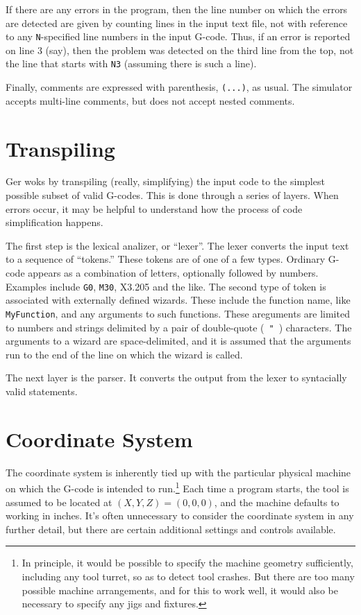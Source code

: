 \documentclass[titlepage,oneside,10pt]{article}
\begin{document}
If there are any errors in the program, then the line number on
which the errors are detected are given by counting lines in the input
text file, not with reference to any {\tt N}-specified line numbers in
the input G-code. Thus, if an error is reported on line 3 (say), then the
problem was detected on the third line from the top, not the line that
starts with {\tt N3} (assuming there is such a line).

Finally, comments are expressed with parenthesis, {\tt (...)}, as
usual. The simulator accepts multi-line comments, but does not accept
nested comments.


\vskip 2cm

\section{Transpiling}

Ger woks by transpiling (really, simplifying) the input code to
the simplest possible subset of valid G-codes. This is done through a
series of layers. When errors occur, it may be helpful to
understand how the process of code simplification happens.

The first step is the lexical analizer, or ``lexer''. The lexer
converts the input text to a sequence of ``tokens.'' These tokens are
of one of a few types. Ordinary G-code appears as a combination of
letters, optionally followed by numbers. Examples include {\tt G0},
{\tt M30}, {X3.205} and the like. The second type of token is
associated with externally defined wizards. These include the
function name, like {\tt MyFunction}, and any arguments to such
functions. These areguments are limited to numbers and strings
delimited by a pair of double-quote (\ {\tt "}\ ) characters. The
arguments to a wizard are space-delimited, and it is assumed that
the arguments run to the end of the line on which the wizard is
called.

The next layer is the parser. It converts the output from the lexer to
syntacially valid statements. 

\section{Coordinate System}

The coordinate system is inherently tied up with the
particular physical machine on which the G-code is intended to
run.\footnote{In principle, it would be possible to specify the machine
geometry sufficiently, including any tool turret, so as to detect
tool crashes. But there are too many possible machine
arrangements, and for this to work well, it would also be necessary to
specify any jigs and fixtures.} Each time a program starts, the tool
is assumed to be located at $(X,Y,Z) = (0,0,0)$, and the machine
defaults to working in inches. It's often unnecessary to consider the
coordinate system in any further detail, but there are certain
additional settings and controls available.
\end{document}
